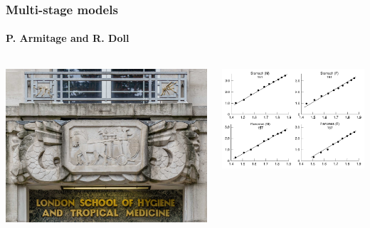 \documentclass{beamer}
\begin{document}
\begin{frame}
    \frametitle{Multi-stage models}
    \framesubtitle{P. Armitage and R. Doll\footnotemark[12]}

    \begin{columns}
        \begin{column}{0.5\textwidth}
        \includegraphics[width=\textwidth]{figures/LSHTM-small.jpg}
        \end{column}
        \begin{column}{0.5\textwidth}
        \includegraphics[width=\textwidth]{figures/PArmitageRDoll_1954_6602297.pdf}
        \end{column}
    \end{columns}


\end{frame}
\end{document}

